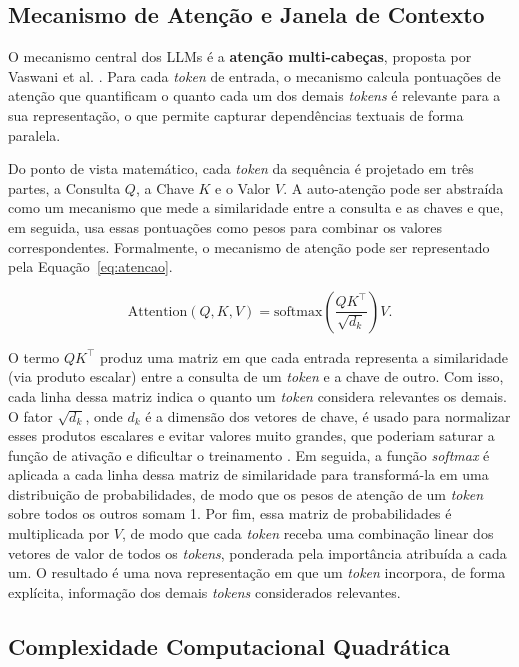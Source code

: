 \subsection{Mecanismo de Atenção e Janela de Contexto}
\label{subsec:atencao}

O mecanismo central dos LLMs é a \textbf{atenção multi-cabeças}, proposta por Vaswani et al. \cite{vaswani2017attention}. Para cada \textit{token} de entrada, o mecanismo calcula pontuações de atenção que quantificam o quanto cada um dos demais \textit{tokens} é relevante para a sua representação, o que permite capturar dependências textuais de forma paralela.

Do ponto de vista matemático, cada \textit{token} da sequência é projetado em três partes, a Consulta $Q$, a Chave $K$ e o Valor $V$. A auto-atenção pode ser abstraída como um mecanismo que mede a similaridade entre a consulta e as chaves e que, em seguida, usa essas pontuações como pesos para combinar os valores correspondentes. Formalmente, o mecanismo de atenção pode ser representado pela Equação~\ref{eq:atencao}.

\begin{equation}
\label{eq:atencao}
\mathrm{Attention}(Q,K,V) = \mathrm{softmax}\!\left(\frac{QK^{\top}}{\sqrt{d_k}}\right) V.
\end{equation}

O termo $QK^{\top}$ produz uma matriz em que cada entrada representa a similaridade (via produto escalar) entre a consulta de um \textit{token} e a chave de outro. Com isso, cada linha dessa matriz indica o quanto um \textit{token} considera relevantes os demais. O fator $\sqrt{d_k}$, onde $d_k$ é a dimensão dos vetores de chave, é usado para normalizar esses produtos escalares e evitar valores muito grandes, que poderiam saturar a função de ativação e dificultar o treinamento \cite{vaswani2017attention}. Em seguida, a função \textit{softmax} é aplicada a cada linha dessa matriz de similaridade para transformá-la em uma distribuição de probabilidades, de modo que os pesos de atenção de um \textit{token} sobre todos os outros somam 1. Por fim, essa matriz de probabilidades é multiplicada por $V$, de modo que cada \textit{token} receba uma combinação linear dos vetores de valor de todos os \textit{tokens}, ponderada pela importância atribuída a cada um. O resultado é uma nova representação em que um \textit{token} incorpora, de forma explícita, informação dos demais \textit{tokens} considerados relevantes.

\subsection{Complexidade Computacional Quadrática}
\label{subsec:complexidade}

